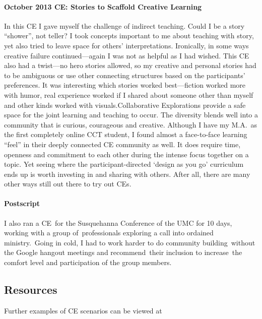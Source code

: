 \paragraph{October 2013 CE: Stories to Scaffold Creative
Learning}\label{october-2013-ce-stories-to-scaffold-creative-learning}

In this CE I gave myself the challenge of indirect teaching. Could I be
a story ``shower'', not teller? I took concepts important to me about
teaching with story, yet also tried to leave space for others'
interpretations. Ironically, in some ways creative failure
continued---again I was not as helpful as I had wished. This CE also had
a twist---no hero stories allowed, so my creative and personal stories
had to be ambiguous or use other connecting structures based on the
participants' preferences. It was interesting which stories worked
best---fiction worked more with humor, real experience worked if I
shared about someone other than myself and other kinds worked with
visuals.Collaborative Explorations provide a safe space for the joint
learning and teaching to occur. The diversity blends well into a
community that is curious, courageous and creative. Although I have my
M.A.~as the first completely online CCT student, I found almost a
face-to-face learning ``feel'' in their deeply connected CE community as
well. It does require time, openness and commitment to each other during
the intense focus together on a topic. Yet seeing where the
participant-directed `design as you go' curriculum ends up is worth
investing in and sharing with others. After all, there are many other
ways still out there to try out CEs.

\paragraph{Postscript}\label{collab-ex-postscript}

I also ran a CE~for the Susquehanna Conference of the UMC for 10 days,
working with a group of~professionals exploring a call into ordained
ministry.~Going in cold, I had to work harder to do community
building~without the Google hangout meetings and recommend~their
inclusion to increase~the comfort level and participation of the group
members.

\subsection{Resources}\label{collab-ex-resources}

Further examples of CE scenarios can be viewed at

